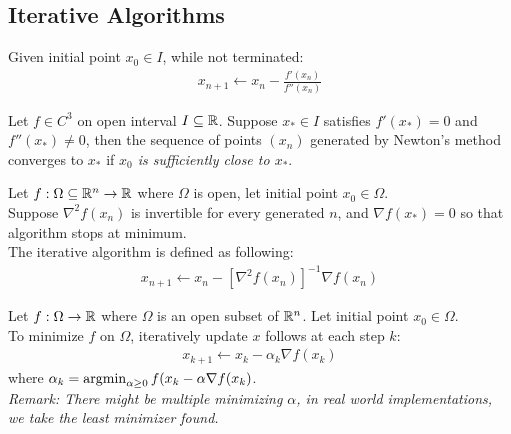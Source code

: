 \documentclass{article}
\begin{document}
\subsection{Iterative Algorithms}
    \begin{algorithm}
        Given initial point $x_0 \in I$, while not terminated:
        \begin{align}
            x_{n+1} \leftarrow x_n - \frac{f'(x_n)}{f''(x_n)}
        \end{align}
    \end{algorithm}

    \begin{theorem}
        Let $f \in C^3$ on open interval $I \subseteq \mathbb{R}$. Suppose $x_* \in I$ satisfies $f'(x_*) = 0$ and $f''(x_*) \neq 0$, then the sequence of points $(x_n)$ generated by Newton's method converges to $x_*$ if \emph{$x_0$ is sufficiently close to $x_*$}.
    \end{theorem}

    \begin{algorithm}
        Let $f: \Omega \subseteq \mathbb{R}^n \to \mathbb{R}$ where $\Omega$ is open, let initial point $x_0 \in \Omega$. \\
        Suppose $\nabla^2 f(x_n)$ is invertible for every generated $n$, and $\nabla f(x_*) = 0$ so that algorithm stops at minimum. \\
        The iterative algorithm is defined as following:
        \begin{align}
            x_{n+1} \leftarrow x_n - [\nabla^2 f(x_n)]^{-1} \nabla f(x_n)
        \end{align}
    \end{algorithm}

    \begin{algorithm}
        Let $f: \Omega \to \mathbb{R}$ where $\Omega$ is an open subset of $\mathbb{R}^n$. Let initial point $x_0 \in \Omega$. \\
        To minimize $f$ on $\Omega$, iteratively update $x$ follows at each step $k$:
        \begin{align}
            x_{k+1} \leftarrow x_k - \alpha_k \nabla f(x_k)
        \end{align}
        where $\alpha_k = \operatorname*{argmin}_{\alpha \geq 0} f(x_k - \alpha \nabla f(x_k)$. \\
        \emph{Remark: There might be multiple minimizing $\alpha$, in real world implementations, we take the least minimizer found.}
    \end{algorithm}
\end{document}
